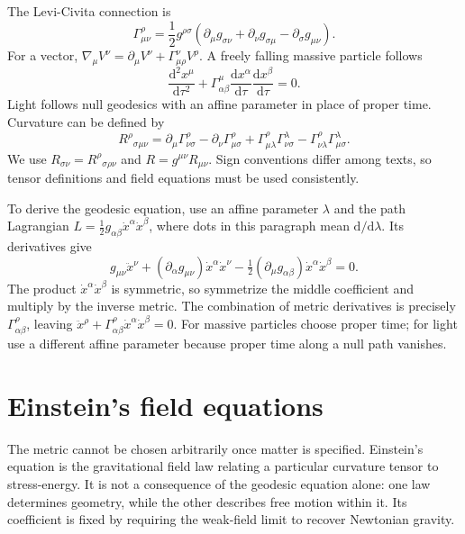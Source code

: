\documentclass[11pt,oneside]{book}
\newcommand{\dd}{\mathrm{d}}
\theoremstyle{reviewstyle}
\begin{document}
The Levi-Civita connection is
\begin{equation}
\Gamma^\rho_{\mu\nu}=\frac12g^{\rho\sigma}(\partial_\mu g_{\sigma\nu}+\partial_\nu g_{\sigma\mu}-\partial_\sigma g_{\mu\nu}).
\end{equation}
For a vector, $\nabla_\mu V^\nu=\partial_\mu V^\nu+\Gamma^\nu_{\mu\rho}V^\rho$. A freely falling massive particle follows
\begin{equation}\frac{\dd^2x^\mu}{\dd\tau^2}+\Gamma^\mu_{\alpha\beta}\frac{\dd x^\alpha}{\dd\tau}\frac{\dd x^\beta}{\dd\tau}=0.\end{equation}
Light follows null geodesics with an affine parameter in place of proper time. Curvature can be defined by
\begin{equation}
R^\rho{}_{\sigma\mu\nu}=\partial_\mu\Gamma^\rho_{\nu\sigma}-\partial_\nu\Gamma^\rho_{\mu\sigma}
+\Gamma^\rho_{\mu\lambda}\Gamma^\lambda_{\nu\sigma}-\Gamma^\rho_{\nu\lambda}\Gamma^\lambda_{\mu\sigma}.
\end{equation}
We use $R_{\sigma\nu}=R^\rho{}_{\sigma\rho\nu}$ and $R=g^{\mu\nu}R_{\mu\nu}$. Sign conventions differ among texts, so tensor definitions and field equations must be used consistently.

To derive the geodesic equation, use an affine parameter $\lambda$ and the path Lagrangian $L=\tfrac12g_{\alpha\beta}\dot x^\alpha\dot x^\beta$, where dots in this paragraph mean $\dd/\dd\lambda$. Its derivatives give
\begin{equation}
g_{\mu\nu}\ddot x^\nu+
(\partial_\alpha g_{\mu\nu})\dot x^\alpha\dot x^\nu
-\tfrac12(\partial_\mu g_{\alpha\beta})\dot x^\alpha\dot x^\beta=0.
\end{equation}
The product $\dot x^\alpha\dot x^\beta$ is symmetric, so symmetrize the middle coefficient and multiply by the inverse metric. The combination of metric derivatives is precisely $\Gamma^\rho_{\alpha\beta}$, leaving $\ddot x^\rho+\Gamma^\rho_{\alpha\beta}\dot x^\alpha\dot x^\beta=0$. For massive particles choose proper time; for light use a different affine parameter because proper time along a null path vanishes.

\section{Einstein's field equations}
The metric cannot be chosen arbitrarily once matter is specified. Einstein's equation is the gravitational field law relating a particular curvature tensor to stress-energy. It is not a consequence of the geodesic equation alone: one law determines geometry, while the other describes free motion within it. Its coefficient is fixed by requiring the weak-field limit to recover Newtonian gravity.
\end{document}
